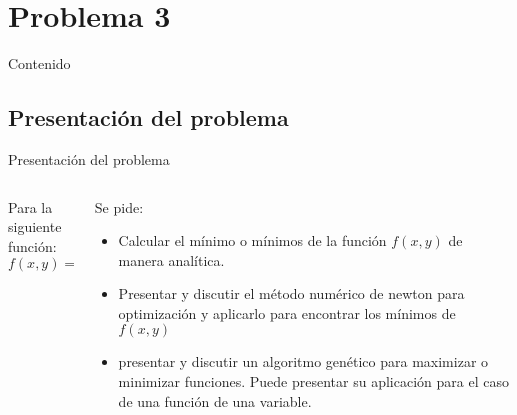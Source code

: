 \section{Problema 3}
\begin{frame}{Contenido}
        \tableofcontents[sections={3}]
\end{frame}
\subsection{Presentación del problema}
    \begin{frame}{Presentación del problema}
        \begin{columns}
            \begin{column}{0.47\textwidth}
                Para la siguiente función:
                \[f(x,y)=x^{4}+y^{4}-x\]
    
                
            \end{column}
            \begin{column}{0.47\textwidth}
                \justify
                Se pide:
                \begin{itemize}
                    \item Calcular el mínimo o mínimos de la función $f(x,y)$ de manera analítica.
                    \item Presentar y discutir el método numérico de newton para optimización y aplicarlo para encontrar los mínimos de $f(x,y)$
                    \item presentar y discutir un algoritmo genético para maximizar o minimizar funciones. Puede presentar su aplicación para el caso de una función de una variable.
                \end{itemize}
            \end{column}
        \end{columns}
                 
    \end{frame}
